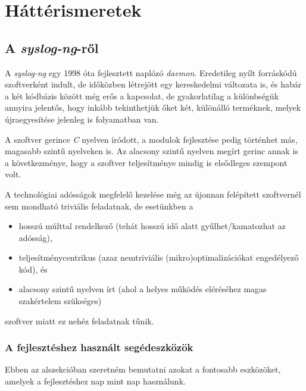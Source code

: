 \chapter{Háttérismeretek}

\section{A \emph{syslog-ng}-ről}

A \emph{syslog-ng} egy 1998 óta fejlesztett naplózó \emph{daemon}. Eredetileg nyílt forráskódú
szoftverként indult, de időközben létrejött egy kereskedelmi változata is, és habár a két kódbázis
között még erős a kapcsolat, de gyakorlatilag a különbségük annyira jelentős, hogy inkább
tekinthetjük őket két, különálló terméknek, melyek újraegyesítése jelenleg is folyamatban van.

A szoftver gerince \emph{C} nyelven íródott, a modulok fejlesztése pedig történhet más, magasabb
szintű nyelveken is. Az alacsony szintű nyelven megírt gerinc annak is a következménye, hogy
a szoftver teljesítménye mindig is elsődleges szempont volt.

A technológiai adósságok megfelelő kezelése még az újonnan felépített szoftvernél
sem mondható triviális feladatnak, de esetünkben a
\begin{itemize}
    \item hosszú múlttal rendelkező (tehát hosszú idő alatt gyűlhet/kamatozhat az adósság),
    \item teljesítménycentrikus (azaz nemtriviális (mikro)optimalizációkat engedélyező kód), és
    \item alacsony szintű nyelven írt (ahol a helyes működés eléréséhez magas szakértelem szükséges)
\end{itemize}
szoftver miatt ez nehéz feladatnak tűnik.


\subsection{A fejlesztéshez használt segédeszközök}

Ebben az alszekcióban szeretném bemutatni azokat a fontosabb eszközöket, amelyek a fejlesztéshez nap
mint nap használunk.

